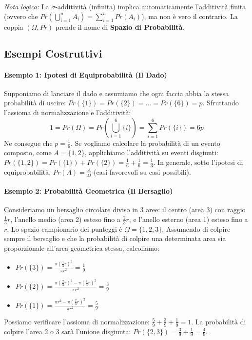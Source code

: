 \documentclass[12pt, a4paper]{article}
\begin{document}
\textit{Nota logica:} La $\sigma$-additività (infinita) implica automaticamente l'additività finita (ovvero che $Pr(\bigcup_{i=1}^n A_i) = \sum_{i=1}^n Pr(A_i)$), ma non è vero il contrario.
La coppia $(\Omega, Pr)$ prende il nome di \textbf{Spazio di Probabilità}.

\subsection{Esempi Costruttivi}

\paragraph{Esempio 1: Ipotesi di Equiprobabilità (Il Dado)}
Supponiamo di lanciare il dado e assumiamo che ogni faccia abbia la stessa probabilità di uscire: $Pr(\{1\}) = Pr(\{2\}) = \dots = Pr(\{6\}) = p$.
Sfruttando l'assioma di normalizzazione e l'additività:
$$ 1 = Pr(\Omega) = Pr\left(\bigcup_{i=1}^6 \{i\}\right) = \sum_{i=1}^6 Pr(\{i\}) = 6p $$ 
Ne consegue che $p = \frac{1}{6}$. 
Se vogliamo calcolare la probabilità di un evento composto, come $A = \{1, 2\}$, applichiamo l'additività su eventi disgiunti: $Pr(\{1,2\}) = Pr(\{1\}) + Pr(\{2\}) = \frac{1}{6} + \frac{1}{6} = \frac{1}{3}$.
In generale, sotto l'ipotesi di equiprobabilità, $Pr(A) = \frac{A}{\Omega}$ (casi favorevoli su casi possibili).

\paragraph{Esempio 2: Probabilità Geometrica (Il Bersaglio)}
Consideriamo un bersaglio circolare diviso in 3 aree: il centro (area 3) con raggio $\frac{1}{3}r$, l'anello medio (area 2) esteso fino a $\frac{2}{3}r$, e l'anello esterno (area 1) esteso fino a $r$. Lo spazio campionario dei punteggi è $\Omega = \{1, 2, 3\}$.
Assumendo di colpire sempre il bersaglio e che la probabilità di colpire una determinata area sia proporzionale all'area geometrica stessa, calcoliamo:
\begin{itemize}
    \item $Pr(\{3\}) = \frac{\pi (\frac{1}{3}r)^2}{\pi r^2} = \frac{1}{9}$ 
    \item $Pr(\{2\}) = \frac{\pi (\frac{2}{3}r)^2 - \pi (\frac{1}{3}r)^2}{\pi r^2} = \frac{3}{9}$ 
    \item $Pr(\{1\}) = \frac{\pi r^2 - \pi (\frac{2}{3}r)^2}{\pi r^2} = \frac{5}{9}$ 
\end{itemize}
Possiamo verificare l'assioma di normalizzazione: $\frac{5}{9} + \frac{3}{9} + \frac{1}{9} = 1$. La probabilità di colpire l'area 2 o 3 sarà l'unione disgiunta: $Pr(\{2,3\}) = \frac{3}{9} + \frac{1}{9} = \frac{4}{9}$.
\end{document}
